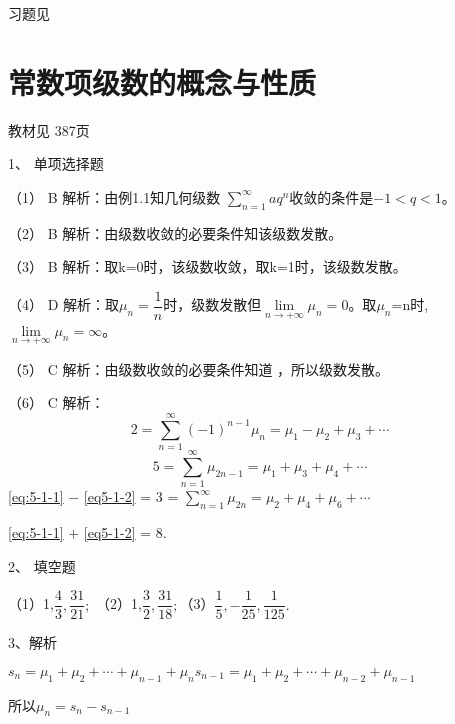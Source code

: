 \begin{flushright}
  \color{zhanqing!80}
   习题见
\end{flushright}


\section{常数项级数的概念与性质}
\begin{flushright}
  \color{zhanqing!80}
   教材见 387页 %
\end{flushright}
1、  单项选择题

（1） B
解析：由例1.1知几何级数  $\sum\limits_{n = 1}^\infty  {a{q^n}} $收敛的条件是$ - 1 < q < 1 $。

（2） B
解析：由级数收敛的必要条件知该级数发散。

（3） B
解析：取k=0时，该级数收敛，取k=1时，该级数发散。

（4） D
解析：取${\mu _n} = \dfrac{1}{n}$时，级数发散但$\lim\limits_{n \to +\infty} {\mu _n} = 0$。取${\mu _n}$=n时,$\lim\limits_{n \to +\infty} {\mu _n} = \infty $。

（5） C
解析：由级数收敛的必要条件知道 ，所以级数发散。

（6） C
解析：
\begin{equation}\label{eq:5-1-1}
  {2 = \sum\limits_{n = 1}^\infty  {( - 1)} ^{n - 1}}{\mu _n} = {\mu _1} - {\mu _2} + {\mu _3} + \cdots
\end{equation}
\begin{equation}\label{eq5-1-2}
  5 = \sum\limits_{n = 1}^\infty  {{\mu _{2n - 1}}}  = {\mu _1} + {\mu _3} + {\mu _4} + \cdots
\end{equation}
  \autoref{eq:5-1-1} $-$ \autoref{eq5-1-2} = 3 = $\sum\limits_{n = 1}^\infty  {{\mu _{2n}}}  = {\mu _2} + {\mu _4} + {\mu _6} + \cdots$

  \autoref{eq:5-1-1} $+$ \autoref{eq5-1-2} = 8.

  2、  填空题

（1）1,$\dfrac{4}{3},\dfrac{{31}}{{21}};$ （2）1,$\dfrac{3}{2},\dfrac{{31}}{{18}};$（3）$\dfrac{1}{5}, - \dfrac{1}{{25}},\dfrac{1}{{125}}.$

3、解析

${s_n} = {\mu _1} + {\mu _2} + \cdots + {\mu _{n - 1}} + {\mu _n} {s_{n - 1}} = {\mu _1} + {\mu _2} + \cdots + {\mu _{n - 2}} + {\mu _{n - 1}}$

所以${\mu _n} = {s_n} - {s_{n - 1}}$

